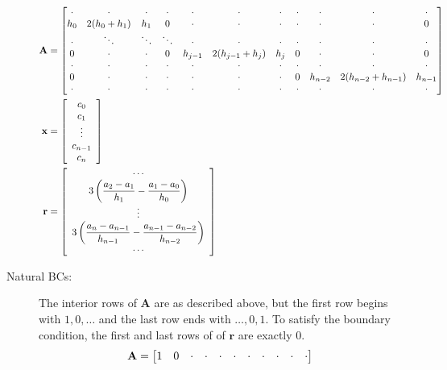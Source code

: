 \documentclass[11pt]{article}
\begin{document}
\begin{description}
\begin{align*}
\mathbf{A} & = \setcounter{MaxMatrixCols}{20}
\begin{bmatrix}
\cdot & \cdot & \cdot & \cdot & \cdot & \cdot & \cdot & \cdot & \cdot &\cdot & \cdot \\
h_0 & 2(h_0+h_1) & h_1 & 0 & \cdot & \cdot & \cdot& \cdot & \cdot &\cdot & 0\\
\cdot & \ddots & \ddots & \ddots & \cdot & \cdot & \cdot & \cdot & \cdot &\cdot & \cdot \\
0 & \cdot & \cdot & 0 & h_{j-1} & 2(h_{j-1}+h_{j}) & h_{j} & 0 & \cdot & \cdot & 0\\
\cdot & \cdot & \cdot & \cdot & \cdot & \cdot & \cdot & \cdot & \cdot &\cdot & \cdot \\
0 & \cdot & \cdot & \cdot& \cdot & \cdot &\cdot & 0 & h_{n-2} & 2(h_{n-2}+h_{n-1}) & h_{n-1}\\
\cdot & \cdot & \cdot & \cdot & \cdot & \cdot & \cdot & \cdot & \cdot &\cdot & \cdot \\
\end{bmatrix}\\
\mathbf{x} & = 
\left[\begin{array}{c}
c_0 \\
c_1 \\
\vdots \\
c_{n-1} \\
c_n \\
\end{array}\right]\\
\mathbf{r} & = 
\left[\begin{array}{c}
\cdots \\
3\left(\dfrac{a_2-a_1}{h_1} - \dfrac{a_1-a_0}{h_0}\right) \\
\vdots \\
3\left(\dfrac{a_n-a_{n-1}}{h_{n-1}} - \dfrac{a_{n-1}-a_{n-2}}{h_{n-2}}\right) \\
\cdots \\
\end{array}\right]
\end{align*}
\item[Natural BCs:] The interior rows of \(\mathbf{A}\) are as described above, but the first row begins with \(1, 0, \dots\) and the last row ends with \(\dots, 0, 1\). To satisfy the boundary condition, the first and last rows of of \(\mathbf{r}\) are exactly \(0\).
\begin{align*}
\mathbf{A} & = \setcounter{MaxMatrixCols}{20}
\begin{bmatrix}
1 & 0 & \cdot & \cdot & \cdot & \cdot & \cdot & \cdot & \cdot &\cdot & \cdot \\

\end{bmatrix}
\end{align*}
\end{description}
\end{document}
